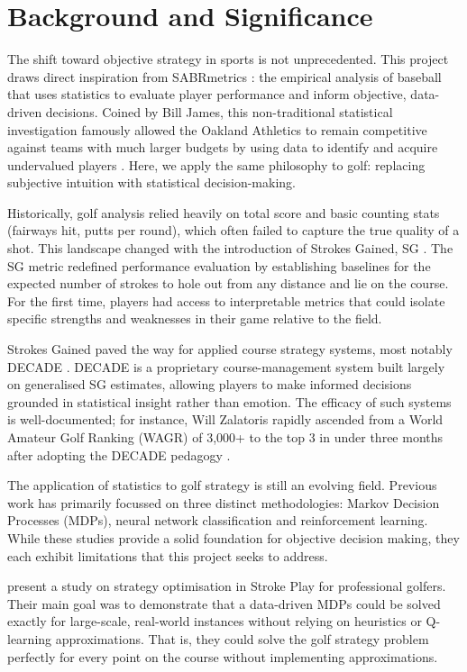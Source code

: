 \documentclass[11pt, letterpaper]{article}
\begin{document}
\section{Background and Significance}
\label{sec:Background}

The shift toward objective strategy in sports is not unprecedented. This project draws direct inspiration from SABRmetrics \parencite{albert2010sabermetrics}: the empirical analysis of baseball that uses statistics to evaluate player performance and inform objective, data-driven decisions. Coined by Bill James, this non-traditional statistical investigation famously allowed the Oakland Athletics to remain competitive against teams with much larger budgets by using data to identify and acquire undervalued players \parencite{moneyball_lewis}. Here, we apply the same philosophy to golf: replacing subjective intuition with statistical decision-making.

Historically, golf analysis relied heavily on total score and basic counting stats (fairways hit, putts per round), which often failed to capture the true quality of a shot. This landscape changed with the introduction of Strokes Gained, SG \parencite{Broadie_2014a}. The SG metric redefined performance evaluation by establishing baselines for the expected number of strokes to hole out from any distance and lie on the course. For the first time, players had access to interpretable metrics that could isolate specific strengths and weaknesses in their game relative to the field.

Strokes Gained paved the way for applied course strategy systems, most notably DECADE \parencite{decade_golf}. DECADE is a proprietary course-management system built largely on generalised SG estimates, allowing players to make informed decisions grounded in statistical insight rather than emotion. The efficacy of such systems is well-documented; for instance, Will Zalatoris rapidly ascended from a World Amateur Golf Ranking (WAGR) of 3,000+ to the top 3 in under three months after adopting the DECADE pedagogy \parencite{decade_golf}.

The application of statistics to golf strategy is still an evolving field. Previous work has primarily focussed on three distinct methodologies: Markov Decision Processes (MDPs), neural network classification and reinforcement learning. While these studies provide a solid foundation for objective decision making, they each exhibit limitations that this project seeks to address.

\cite{stauffer_golf_2025} present a study on strategy optimisation in Stroke Play for professional golfers. Their main goal was to demonstrate that a data-driven MDPs could be solved exactly for large-scale, real-world instances without relying on heuristics or Q-learning approximations. That is, they could solve the golf strategy problem perfectly for every point on the course without implementing approximations.
\end{document}
